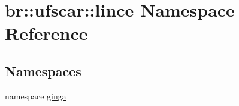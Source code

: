 \hypertarget{namespacebr_1_1ufscar_1_1lince}{
\section{br::ufscar::lince Namespace Reference}
\label{namespacebr_1_1ufscar_1_1lince}
}
\subsection*{Namespaces}
\begin{DoxyCompactItemize}
\item 
namespace \hyperlink{namespacebr_1_1ufscar_1_1lince_1_1ginga}{ginga}
\end{DoxyCompactItemize}
